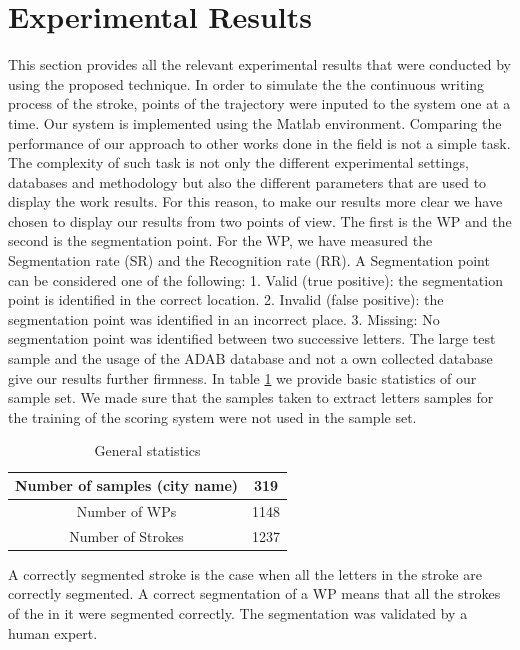 \documentclass[journal,compsoc]{IEEEtran}
\begin{document}
\section{Experimental Results}
\label{sec:results}
This section provides all the relevant experimental results that were conducted by using the proposed technique. In order to simulate the the continuous writing process of the stroke, points of the trajectory were inputed to the system one at a time. Our system is implemented using the Matlab environment. Comparing the performance of our approach to other works done in the field is not a simple task. The complexity of such task is not only the different experimental settings, databases and methodology but also the different parameters that are used to display the work results. For this reason, to make our results more clear we have chosen to display our results from two points of view. The first is the WP and the second is the segmentation point. For the WP, we have measured the Segmentation rate (SR) and the Recognition rate (RR). A Segmentation point can be considered one of the following: 1. Valid (true positive): the segmentation point is identified in the correct location. 2. Invalid (false positive): the segmentation point was identified in an incorrect place. 3. Missing: No segmentation point was identified between two successive letters.
The large test sample and the usage of the ADAB database and not a own collected database give our results further firmness. In table \ref{table:general_stats} we provide basic statistics of our sample set. We made sure that the samples taken to extract letters samples for the training of the scoring system were not used in the sample set.

\begin{table}[h]
\caption{General statistics}
\begin{tabular}{ | c | c | }
  \hline
  Number of samples (city name) & 319 \\
  \hline
  Number of WPs & 1148 \\
  \hline
  Number of Strokes & 1237 \\
  \hline
\end{tabular}
\centering
\label{table:general_stats} 
\end{table}

A correctly segmented stroke is the case when all the letters in the stroke are correctly segmented. A correct segmentation of a WP means that all the strokes of the in it were segmented correctly. The segmentation was validated by a human expert.
\end{document}
